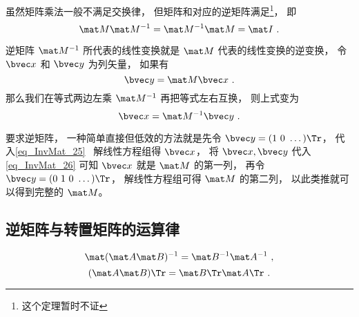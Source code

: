 虽然矩阵乘法一般不满足交换律， 但矩阵和对应的逆矩阵满足\footnote{这个定理暂时不证}， 即
\begin{equation}
\mat M\mat M^{-1} = \mat M^{-1} \mat M = \mat I~.
\end{equation}

逆矩阵 $\mat M^{-1}$ 所代表的线性变换就是 $\mat M$ 代表的线性变换的逆变换， 令 $\bvec x$ 和 $\bvec y$ 为列矢量， 如果有
\begin{equation}\label{eq_Mat_25}
\bvec y = \mat M \bvec x~.
\end{equation}
那么我们在等式两边左乘 $\mat M^{-1}$ 再把等式左右互换， 则上式变为
\begin{equation}\label{eq_Mat_26}
\bvec x = \mat M^{-1} \bvec y~.
\end{equation}

要求逆矩阵， 一种简单直接但低效的方法就是先令 $\bvec y = (1\ 0\ \dots)\Tr$， 代入\autoref{eq_InvMat_25}~ 解线性方程组得 $\bvec x$， 将 $\bvec x, \bvec y$ 代入\autoref{eq_InvMat_26} 可知 $\bvec x$ 就是 $\mat M$ 的第一列， 再令 $\bvec y = (0\ 1\ 0\ \dots)\Tr$， 解线性方程组可得 $\mat M$ 的第二列， 以此类推就可以得到完整的 $\mat M$。

\subsection{逆矩阵与转置矩阵的运算律}

\begin{equation}
\mat (\mat A \mat B)^{-1}=\mat B^{-1} \mat A^{-1}~,
\end{equation}
\begin{equation}
(\mat A \mat B)\Tr=\mat B\Tr \mat A\Tr~.
\end{equation}
